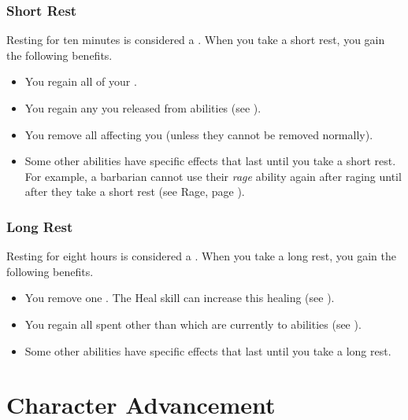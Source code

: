         \subsubsection{Short Rest}\label{Short Rest}
            Resting for ten minutes is considered a .
            When you take a short rest, you gain the following benefits.
            \begin{itemize}
                \item You regain all of your .
                \item You regain any  you released from  abilities (see ).
                \item You remove all  affecting you (unless they cannot be removed normally).
                \item Some other abilities have specific effects that last until you take a short rest.
                    For example, a barbarian cannot use their \textit{rage} ability again after raging until after they take a short rest (see Rage, page ).
            \end{itemize}

        \subsubsection{Long Rest}\label{Long Rest}
            Resting for eight hours is considered a .
            When you take a long rest, you gain the following benefits.
            \begin{itemize}
                \item You remove one .
                    The Heal skill can increase this healing (see ).
                \item You regain all spent  other than  which are currently  to abilities (see ).
                \item Some other abilities have specific effects that last until you take a long rest.
            \end{itemize}

\section{Character Advancement}\label{Character Advancement}

